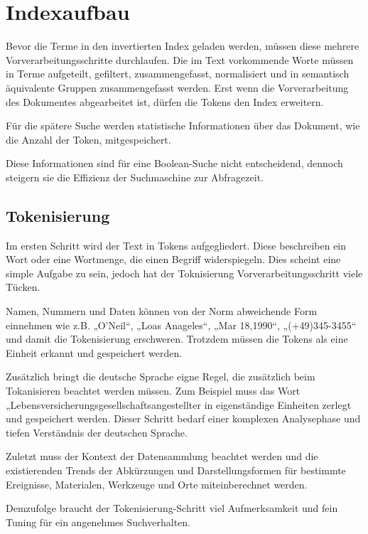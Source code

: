 \section[Indexaufbau ]{Indexaufbau }


Bevor die Terme in den invertierten Index geladen werden, müssen diese
mehrere Vorverarbeitungsschritte durchlaufen. Die im Text vorkommende
Worte müssen in Terme aufgeteilt, gefiltert, zusammengefasst,
normalisiert und in semantisch äquivalente Gruppen zusammengefasst
werden. Erst wenn die Vorverarbeitung des Dokumentes abgearbeitet ist,
dürfen die Tokens den Index erweitern. 

Für die spätere Suche werden statistische Informationen über das
Dokument, %
wie die Anzahl der Token, mitgespeichert.

Diese Informationen sind für eine Boolean-Suche nicht entscheidend,
dennoch steigern sie die Effizienz der Suchmaschine zur Abfragezeit.

\subsection[Tokenisierung]{Tokenisierung}


Im ersten Schritt wird der Text in Tokens aufgegliedert. Diese
beschreiben ein Wort oder eine Wortmenge, die einen Begriff
widerspiegeln. Dies scheint eine simple Aufgabe zu sein, jedoch hat der
Toknisierung Vorverarbeitungsschritt viele Tücken. 

Namen, Nummern und Daten können von der Norm abweichende Form einnehmen
wie z.B. „O'Neil“, „Loas Anageles“, „Mar 18,1990“,
„(+49)345-3455“ und damit die Tokenisierung erschweren. Trotzdem müssen
die Tokens als eine Einheit erkannt und gespeichert werden. \ 


Zusätzlich bringt die deutsche Sprache eigne Regel, die zusätzlich beim
Tokanisieren beachtet werden müssen. Zum Beispiel muss das Wort
„Lebensversicherungsgesellschaftsangestellter{\textquotedbl} in
eigenständige Einheiten zerlegt und gespeichert werden. Dieser Schritt
bedarf einer komplexen Analysephase und tiefen Verständnis der
deutschen Sprache. 

Zuletzt muss der Kontext der Datensammlung beachtet werden und die
existierenden Trends der Abkürzungen und Darstellungsformen für
bestimmte Ereignisse, Materialen, Werkzeuge und Orte miteinberechnet
werden.

Demzufolge braucht der Tokenisierung-Schritt viel Aufmerksamkeit und
fein Tuning für ein angenehmes Suchverhalten. \ 


